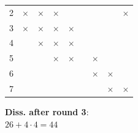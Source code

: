 \documentclass[a4paper, 10pt]{article}
\begin{document}
\begin{table}[htbp]
\begin{minipage}{0.42\linewidth}
{\begin{tabular}{c | c c c c c c c c}
			2 & $\times$ & $\times$ & $\times$ &          &   &          &          & $\times$ \\
			3 & $\times$ & $\times$ & $\times$ & $\times$ &   &          &          &          \\
			4 &          & $\times$ & $\times$ & $\times$ &   &          &          &          \\
			5 &          &          & $\times$ & $\times$ &   & $\times$ &          &          \\
			6 &          &          &          &          &   & $\times$ & $\times$ &          \\
			7 &          &          &          &          &   &          & $\times$ & $\times$ \\
		\end{tabular}
	}
\end{minipage}
\begin{minipage}{0.42\linewidth}
	\vspace{0.3cm}
	\textbf{Diss. after round 3}: \\
	$26 + 4 \cdot 4 = 44$ \\
	\vspace{-0.1cm} \\
\end{minipage}
\end{table}
\end{document}

